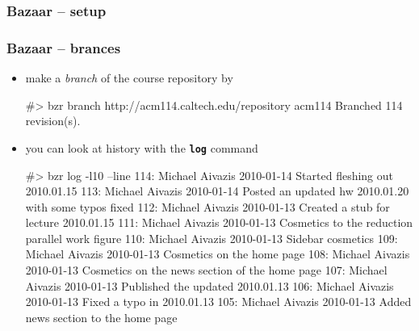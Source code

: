 \begin{frame}[fragile]
%
  \frametitle{Bazaar -- setup}
%
%
\end{frame}

\begin{frame}[fragile]
%
  \frametitle{Bazaar -- brances}
%
  \begin{itemize}
%
  \item make a {\em branch} of the course repository by
%
    \begin{shell}

#> bzr branch http://acm114.caltech.edu/repository acm114
Branched 114 revision(s).
    \end{shell}
%
  \item you can look at history with the {\tt\small\bfseries log} command
%
    \begin{shell}

#> bzr log -l10 --line
114: Michael Aivazis 2010-01-14 Started fleshing out 2010.01.15
113: Michael Aivazis 2010-01-14 Posted an updated hw 2010.01.20 with some typos fixed
112: Michael Aivazis 2010-01-13 Created a stub for lecture 2010.01.15
111: Michael Aivazis 2010-01-13 Cosmetics to the reduction parallel work figure
110: Michael Aivazis 2010-01-13 Sidebar cosmetics
109: Michael Aivazis 2010-01-13 Cosmetics on the home page
108: Michael Aivazis 2010-01-13 Cosmetics on the news section of the home page
107: Michael Aivazis 2010-01-13 Published the updated 2010.01.13
106: Michael Aivazis 2010-01-13 Fixed a typo in 2010.01.13
105: Michael Aivazis 2010-01-13 Added news section to the home page
    \end{shell}
%
  \end{itemize}
%
\end{frame}

